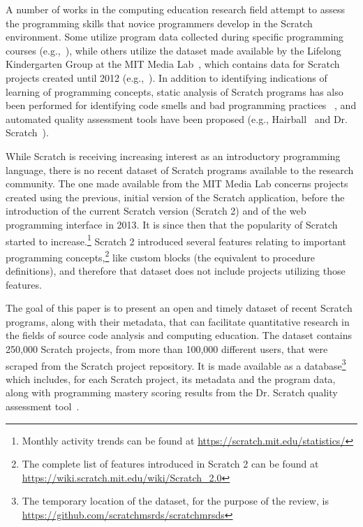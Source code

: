 \documentclass[10pt, conference]{IEEEtran}
\begin{document}
A number of works in the computing education research field attempt to assess the programming skills that novice programmers develop in the Scratch environment.
Some utilize program data collected during specific programming courses (e.g.,~\cite{meerbaum-salant_learning_2010, wilson_evaluation_2012, Maloney_2008}), while others utilize the dataset made available by the Lifelong Kindergarten Group at the MIT Media Lab~\cite{2017_scratch_dataset}, which contains data for Scratch projects created until 2012 (e.g.,~\cite{fields_2014, yang_2015, Dasgupta_2016}).
In addition to identifying indications of learning of programming concepts, static analysis of Scratch programs has also been performed for identifying code smells and bad programming practices ~\cite{Meerbaum_habits_2011, Aivaloglou_2016}, and automated quality assessment tools have been proposed (e.g., Hairball~\cite{boe_hairball:_2013} and Dr. Scratch~\cite{moreno_automatic_2014}).

While Scratch is receiving increasing interest as an introductory programming language, there is no recent dataset of Scratch programs available to the research community.
The one made available from the MIT Media Lab concerns projects created using the previous, initial version of the Scratch application, before the introduction of the current Scratch version (Scratch 2) and of the web programming interface in 2013.
It is since then that the popularity of Scratch started to increase.\footnote{Monthly activity trends can be found at \url{https://scratch.mit.edu/statistics/}}
Scratch 2 introduced several features relating to important programming concepts,\footnote{The complete list of features introduced in Scratch 2 can be found at \url{https://wiki.scratch.mit.edu/wiki/Scratch_2.0}} like custom blocks (the equivalent to procedure definitions), and therefore that dataset does not include projects utilizing those features.

The goal of this paper is to present an open and timely dataset of recent Scratch programs, along with their metadata, that can facilitate quantitative research in the fields of source code analysis and computing education.
The dataset contains 250,000 Scratch projects, from more than 100,000 different users, that were scraped from the Scratch project repository.
It is made available as a database\footnote{\label{dataseturl}The temporary location of the dataset, for the purpose of the review, is \url{https://github.com/scratchmsrds/scratchmrsds}} which includes, for each Scratch project, its metadata and the program data, along with programming mastery scoring results from the Dr. Scratch quality assessment tool~\cite{moreno_automatic_2014}.
\end{document}
